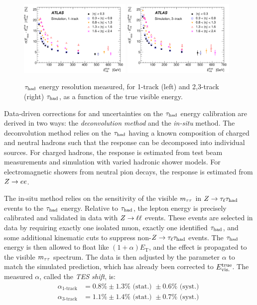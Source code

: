 \begin{figure}[tp]
  \centering
  \includegraphics[width=0.48\textwidth]{figures/PERF-2013-06/fig_16a}
  \includegraphics[width=0.48\textwidth]{figures/PERF-2013-06/fig_16b}
  \caption{$\tau_\text{had}$ energy resolution measured, for 1-track (left) and 2,3-track (right) $\tau_\text{had}$, as a function of the true visible energy.}
  \label{fig:taus-resolution}
\end{figure}

Data-driven corrections for and uncertainties on the $\tau_\text{had}$ energy calibration are derived in two ways: the \textit{deconvolution method} and the \textit{in-situ} method. The deconvolution method relies on the $\tau_\text{had}$ having a known composition of charged and neutral hadrons such that the response can be decomposed into individual sources. For charged hadrons, the response is estimated from test beam measurements and simulation with varied hadronic shower models. For electromagnetic showers from neutral pion decays, the response is estimated from $Z \rightarrow ee$.

The in-situ method relies on the sensitivity of the visible $m_{\tau\tau}$ in $Z\rightarrow\tau_\ell\tau_\text{had}$ events to the $\tau_\text{had}$ energy. Relative to $\tau_\text{had}$, the lepton energy is precisely calibrated and validated in data with $Z \rightarrow \ell\ell$ events. These events are selected in data by requiring exactly one isolated muon, exactly one identified $\tau_\text{had}$, and some additional kinematic cuts to suppress non-$Z\rightarrow\tau_\ell\tau_\text{had}$ events. The $\tau_\text{had}$ energy is then allowed to float like $(1 + \alpha)E_\text{T}$, and the effect is propagated to the visible $m_{\tau\tau}$ spectrum. The data is then adjusted by the parameter $\alpha$ to match the simulated prediction, which has already been corrected to $E_\text{vis.}^\text{true}$. The measured $\alpha$, called the \textit{TES shift}, is:
%
\begin{equation}
  \begin{split}
    \alpha_\text{1-track} &= 0.8\% \pm 1.3\% \text{ (stat.) } \pm 0.6\% \text{ (syst.) } \\
    \alpha_\text{3-track} &= 1.1\% \pm 1.4\% \text{ (stat.) } \pm 0.7\% \text{ (syst.) } \\
  \end{split}
  \label{eqn:taus-tesshift}
\end{equation}
%

